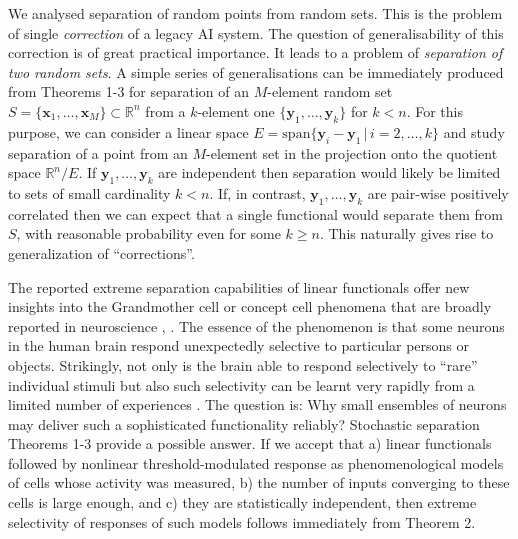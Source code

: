 \documentclass[final,5p,times,twocolumn]{elsarticle}
\begin{document}
We analysed separation of random points from random sets. This is the problem of single {\em correction} of a legacy AI system. The question of generalisability of this correction is of  great practical importance. It leads to a problem of {\em separation of two random sets}. A simple series of generalisations can be immediately produced from Theorems 1-3 for separation of an $M$-element random set $S=\{\boldsymbol{x}_1, \ldots , \boldsymbol{x}_M\} \subset \mathbb{R}^{n}$ from a $k$-element one  $\{\boldsymbol{y}_1, \ldots , \boldsymbol{y}_k\}$ for $k<n$. For this purpose, we can consider a linear space $E=\mathrm{span}\{\boldsymbol{y}_i-\boldsymbol{y}_1 \, | \, i=2,\ldots , k\}$ and study separation of a point from an $M$-element set in the projection onto the quotient space $\mathbb{R}^{n}/E$. If  ${\boldsymbol{y}_1,\ldots,\boldsymbol{y}_k}$ are independent  then separation would likely be limited to sets of small cardinality $k<n$. If, in contrast,   ${\boldsymbol{y}_1,\ldots,\boldsymbol{y}_k}$ are pair-wise positively correlated then we can expect that  a single functional would separate them from $S$, with reasonable probability even for some $k\geq n$. This naturally gives rise to generalization of “corrections”.

The reported extreme separation capabilities of linear functionals offer new insights into the Grandmother cell or concept cell phenomena that are broadly reported in neuroscience \citep{Quiroga2005}, \citep{Quiroga2009}. The essence of the phenomenon is that some neurons in the  human brain respond unexpectedly selective  to particular persons or objects. Strikingly, not only is the brain able to respond selectively to ``rare'' individual stimuli but also such selectivity can be learnt very rapidly from a limited number of experiences \citep{Quiroga2015}. The question is: Why small ensembles of neurons may deliver such a sophisticated functionality reliably? Stochastic separation Theorems 1-3 provide a possible answer. If we accept that a) linear functionals followed by nonlinear threshold-modulated response as phenomenological models of cells whose activity was measured, b) the number of inputs converging to these cells is large enough, and c) they are statistically independent, then extreme selectivity of responses of such models follows immediately from Theorem 2.



\end{document}
